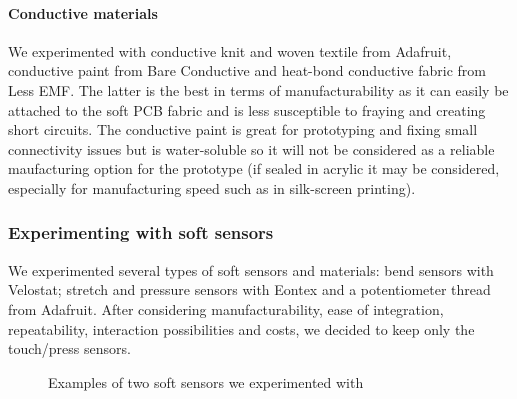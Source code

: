 \paragraph{Conductive materials} We experimented with conductive knit and woven textile from Adafruit, conductive paint from Bare Conductive and heat-bond conductive fabric from Less EMF. The latter is the best in terms of manufacturability as it can easily be attached to the soft PCB fabric and is less susceptible to fraying and creating short circuits. The conductive paint is great for prototyping and fixing small connectivity issues but is water-soluble so it will not be considered as a reliable maufacturing option for the prototype (if sealed in acrylic it may be considered, especially for manufacturing speed such as in silk-screen printing). 
    \subsubsection{Experimenting with soft sensors} 
We experimented several types of soft sensors and materials: bend sensors with Velostat; stretch and pressure sensors with Eontex and a potentiometer thread from Adafruit. After considering manufacturability, ease of integration, repeatability, interaction possibilities and costs, we decided to keep only the touch/press sensors.

\begin{figure}[H]
    \centering
    \hfill
    \hfill
    \caption{Examples of two soft sensors we experimented with} 
    \label{fig:softsens}
\end{figure}

